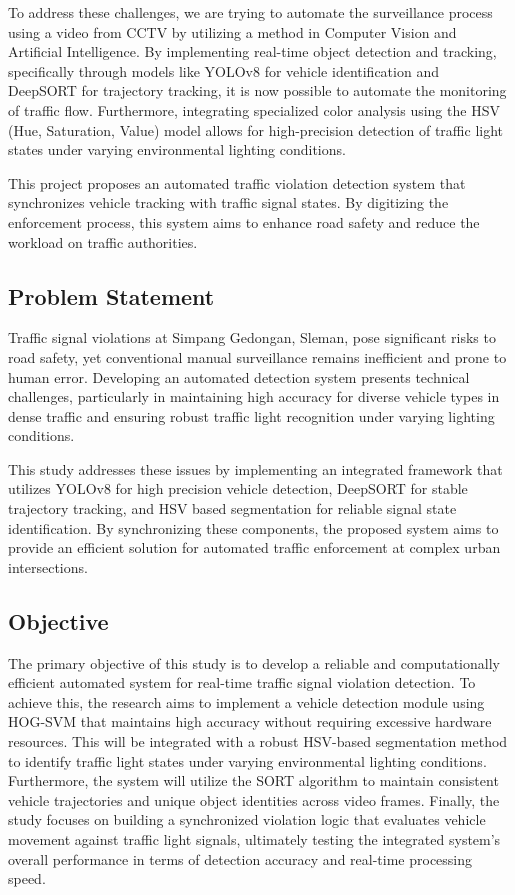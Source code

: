 \documentclass[conference]{IEEEtran}
\begin{document}
To address these challenges, we are trying to automate the surveillance process using a video from CCTV by utilizing a method in Computer Vision and Artificial Intelligence. By implementing real-time object detection and tracking, specifically through models like YOLOv8 for vehicle identification and DeepSORT for trajectory tracking, it is now possible to automate the monitoring of traffic flow. Furthermore, integrating specialized color analysis using the HSV (Hue, Saturation, Value) model allows for high-precision detection of traffic light states under varying environmental lighting conditions.

This project proposes an automated traffic violation detection system that synchronizes vehicle tracking with traffic signal states. By digitizing the enforcement process, this system aims to enhance road safety and reduce the workload on traffic authorities.
\subsection{Problem Statement}
Traffic signal violations at Simpang Gedongan, Sleman, pose significant risks to road safety, yet conventional manual surveillance remains inefficient and prone to human error. Developing an automated detection system presents technical challenges, particularly in maintaining high accuracy for diverse vehicle types in dense traffic and ensuring robust traffic light recognition under varying lighting conditions. 

This study addresses these issues by implementing an integrated framework that utilizes YOLOv8 for high precision vehicle detection, DeepSORT for stable trajectory tracking, and HSV based segmentation for reliable signal state identification. By synchronizing these components, the proposed system aims to provide an efficient solution for automated traffic enforcement at complex urban intersections.
\subsection{Objective}
The primary objective of this study is to develop a reliable and computationally efficient automated system for real-time traffic signal violation detection. To achieve this, the research aims to implement a vehicle detection module using HOG-SVM that maintains high accuracy without requiring excessive hardware resources. This will be integrated with a robust HSV-based segmentation method to identify traffic light states under varying environmental lighting conditions. Furthermore, the system will utilize the SORT algorithm to maintain consistent vehicle trajectories and unique object identities across video frames. Finally, the study focuses on building a synchronized violation logic that evaluates vehicle movement against traffic light signals, ultimately testing the integrated system’s overall performance in terms of detection accuracy and real-time processing speed.
\end{document}
